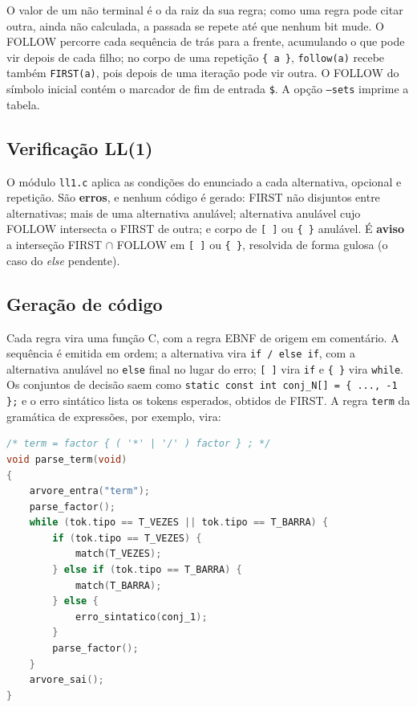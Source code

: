 \documentclass[11pt,a4paper]{article}
\begin{document}
\noindent O valor de um não terminal é o da raiz da sua regra; como uma regra pode citar outra,
ainda não calculada, a passada se repete até que nenhum bit mude. O FOLLOW percorre cada sequência de trás para a frente, acumulando o que
pode vir depois de cada filho; no corpo de uma repetição \texttt{\{ a \}}, \texttt{follow(a)}
recebe também \texttt{FIRST(a)}, pois depois de uma iteração pode vir outra. O FOLLOW do símbolo
inicial contém o marcador de fim de entrada \texttt{\$}. A opção \texttt{--sets} imprime a
tabela.

\subsection{Verificação LL(1)}

O módulo \texttt{ll1.c} aplica as condições do enunciado a cada alternativa, opcional e
repetição. São \textbf{erros}, e nenhum código é gerado: FIRST não disjuntos entre alternativas;
mais de uma alternativa anulável; alternativa anulável cujo FOLLOW intersecta o FIRST de outra;
e corpo de \texttt{[ ]} ou \texttt{\{ \}} anulável. É \textbf{aviso} a interseção FIRST $\cap$
FOLLOW em \texttt{[ ]} ou \texttt{\{ \}}, resolvida de forma gulosa (o caso do \emph{else}
pendente).

\subsection{Geração de código}

Cada regra vira uma função C, com a regra EBNF de origem em comentário. A sequência é emitida em
ordem; a alternativa vira \texttt{if / else if}, com a alternativa anulável no \texttt{else}
final no lugar do erro; \texttt{[ ]} vira \texttt{if} e \texttt{\{ \}} vira \texttt{while}. Os
conjuntos de decisão saem como \texttt{static const int conj\_N[] = \{ ..., -1 \};} e o erro
sintático lista os tokens esperados, obtidos de FIRST. A regra \texttt{term} da gramática de
expressões, por exemplo, vira:

\begin{lstlisting}[language=C]
/* term = factor { ( '*' | '/' ) factor } ; */
void parse_term(void)
{
    arvore_entra("term");
    parse_factor();
    while (tok.tipo == T_VEZES || tok.tipo == T_BARRA) {
        if (tok.tipo == T_VEZES) {
            match(T_VEZES);
        } else if (tok.tipo == T_BARRA) {
            match(T_BARRA);
        } else {
            erro_sintatico(conj_1);
        }
        parse_factor();
    }
    arvore_sai();
}
\end{lstlisting}
\end{document}
